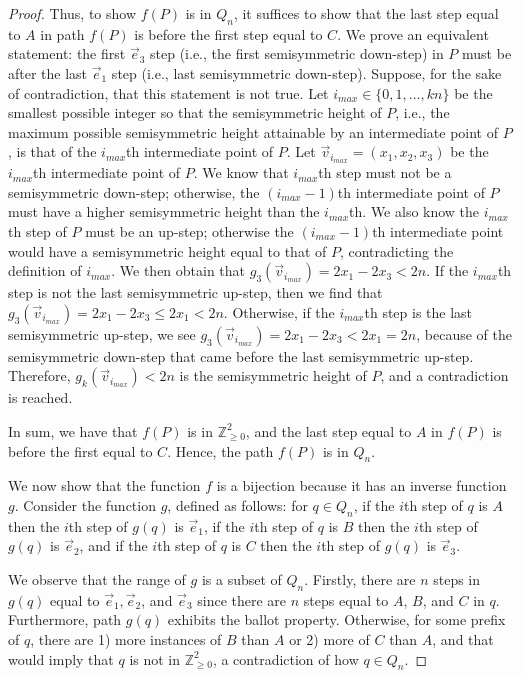 \documentclass[11pt]{article}
\theoremstyle{remark}
\theoremstyle{definition}
\begin{document}
\begin{proof}
    
    Thus, to show $f(P)$ is in $Q_n$, it suffices to show that the last step equal to $A$ in path $f(P)$ is before the first step equal to $C$. We prove an equivalent statement: the first $\vec{e}_3$ step (i.e., the first semisymmetric down-step) in $P$ must be after the last $\vec{e}_1$ step (i.e., last semisymmetric down-step). Suppose, for the sake of contradiction, that this statement is not true. Let $i_{max} \in \{0, 1, \dots, kn\}$ be the smallest possible integer so that the semisymmetric height of $P$, i.e., the maximum possible semisymmetric height attainable by an intermediate point of $P$, is that of the $i_{max}$th intermediate point of $P$. Let $\vec{v}_{i_{max}}=(x_1, x_2, x_3)$ be the $i_{max}$th intermediate point of $P$. We know that $i_{max}$th step must not be a semisymmetric down-step; otherwise, the $(i_{max}-1)$th intermediate point of $P$ must have a higher semisymmetric height than the $i_{max}$th. We also know the $i_{max}$th step of $P$ must be an up-step; otherwise the $(i_{max}-1)$th intermediate point would have a semisymmetric height equal to that of $P$, contradicting the definition of $i_{max}$. We then obtain that $g_3(\vec{v}_{i_{max}})=2x_1-2x_3 < 2n$. If the $i_{max}$th step is not the last semisymmetric up-step, then we find that $g_3(\vec{v}_{i_{max}})=2x_1-2x_3 \leq 2x_1 < 2n$. Otherwise, if the $i_{max}$th step is the last semisymmetric up-step, we see $g_3(\vec{v}_{i_{max}})=2x_1-2x_3 < 2x_1 = 2n$, because of the semisymmetric down-step that came before the last semisymmetric up-step. Therefore, $g_k(\vec{v}_{i_{max}}) < 2n$ is the semisymmetric height of $P$, and a contradiction is reached. 

    In sum, we have that $f(P)$ is in $\mathbb{Z}_{\geq 0}^2$, and the last step equal to $A$ in $f(P)$ is before the first equal to $C$.  Hence, the path $f(P)$ is in $Q_n$.
    
    We now show that the function $f$ is a bijection because it has an inverse function $g$. Consider the function $g$, defined as follows: for $q \in Q_n$, if the $i$th step of $q$ is $A$ then the $i$th step of $g(q)$ is $\vec{e}_1$, if the $i$th step of $q$ is $B$ then the $i$th step of $g(q)$ is $\vec{e}_2$, and if the $i$th step of $q$ is $C$ then the $i$th step of $g(q)$ is $\vec{e}_3$. 
    
    We observe that the range of $g$ is a subset of $Q_n$. Firstly, there are $n$ steps in $g(q)$ equal to $\vec{e}_1, \vec{e}_2$, and $\vec{e}_3$ since there are $n$ steps equal to $A$, $B$, and $C$ in $q$. Furthermore, path $g(q)$ exhibits the ballot property. Otherwise, for some prefix of $q$, there are 1) more instances of $B$  than $A$ or 2) more of $C$ than $A$, and that would imply that $q$ is not in $\mathbb{Z}_{\geq 0}^2$, a contradiction of how $q \in Q_n$.
    

\end{proof}
\end{document}
